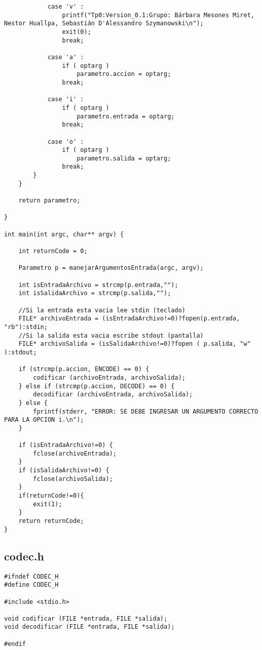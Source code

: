 \documentclass[a4paper,11pt, margin=1in]{article}
\begin{document}
\begin{verbatim}
            case 'v' :
                printf("Tp0:Version_0.1:Grupo: Bárbara Mesones Miret, Nestor Huallpa, Sebastián D'Alessandro Szymanowski\n");
                exit(0);
            	break;
            	
            case 'a' :
                if ( optarg )
               		parametro.accion = optarg;
            	break;
            	
            case 'i' :
                if ( optarg )
					parametro.entrada = optarg;
            	break;
            	
            case 'o' :
                if ( optarg )
					parametro.salida = optarg;
            	break;
        }
    }
    
    return parametro;

}

int main(int argc, char** argv) {

	int returnCode = 0;

	Parametro p = manejarArgumentosEntrada(argc, argv);
	
	int isEntradaArchivo = strcmp(p.entrada,"");
	int isSalidaArchivo = strcmp(p.salida,"");
	
	//Si la entrada esta vacia lee stdin (teclado)
	FILE* archivoEntrada = (isEntradaArchivo!=0)?fopen(p.entrada, "rb"):stdin; 
	//Si la salida esta vacia escribe stdout (pantalla)
	FILE* archivoSalida = (isSalidaArchivo!=0)?fopen ( p.salida, "w" ):stdout; 

	if (strcmp(p.accion, ENCODE) == 0) {
		codificar (archivoEntrada, archivoSalida);
	} else if (strcmp(p.accion, DECODE) == 0) {
		decodificar (archivoEntrada, archivoSalida);
	} else {
		fprintf(stderr, "ERROR: SE DEBE INGRESAR UN ARGUMENTO CORRECTO PARA LA OPCION i.\n");
	}

	if (isEntradaArchivo!=0) {
		fclose(archivoEntrada);
	}
	if (isSalidaArchivo!=0) {
		fclose(archivoSalida);
	}
	if(returnCode!=0){ 
	 	exit(1);
	}
	return returnCode;
}
\end{verbatim}

\subsection{codec.h}
\begin{verbatim}
#ifndef CODEC_H
#define CODEC_H

#include <stdio.h>

void codificar (FILE *entrada, FILE *salida);
void decodificar (FILE *entrada, FILE *salida);

#endif
\end{verbatim}
\end{document}
